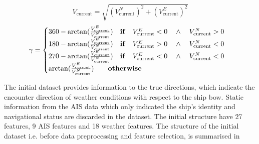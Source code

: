 \begin{equation}\label{eqn:vcurrabs}
    V_{\text{current}} = \sqrt{(V_{\text{current}}^N)^2 + (V_{\text{current}}^E)^2} 
\end{equation}
\begin{equation}\label{eqn:currdir}
    \gamma = 
    \begin{cases}
        360 - \arctan(\frac{V_{\text{current}}^E}{V_{\text{current}}^N}) \quad \text{\textbf{if}} \quad V_{\text{current}}^E < 0 \quad \wedge \quad V_{\text{current}}^N > 0 \\ 
        180 - \arctan(\frac{V_{\text{current}}^E}{V_{\text{current}}^N}) \quad \text{\textbf{if}} \quad V_{\text{current}}^E > 0 \quad \wedge \quad V_{\text{current}}^N < 0 \\ 
        270 - \arctan(\frac{V_{\text{current}}^E}{V_{\text{current}}^N}) \quad \text{\textbf{if}} \quad V_{\text{current}}^E < 0 \quad \wedge \quad V_{\text{current}}^N < 0 \\
        \arctan(\frac{V_{\text{current}}^E}{V_{\text{current}}^N}) \qquad \text{\textbf{otherwise}} 
    \end{cases}   
\end{equation}

The initial dataset provides information to the true directions, which indicate the encounter direction of weather conditions with respect to the ship bow. Static information from the AIS data which only indicated the ship's identity and navigational status are discarded in the dataset. The initial structure have 27 features, 9 AIS features and 18 weather features. The structure of the initial dataset i.e. before data preprocessing and feature selection, is summarised in  \\


